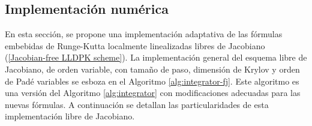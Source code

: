 \subsection{Implementación numérica}\label{sec:fj-num-impl}

En esta sección, se propone una implementación adaptativa de las fórmulas embebidas de Runge-Kutta localmente linealizadas libres de Jacobiano (\ref{Jacobian-free LLDPK scheme}). La implementación general del esquema libre de Jacobiano, de orden variable, con tamaño de paso, dimensión de Krylov y orden de Padé variables se esboza en el Algoritmo \ref{alg:integrator-fj}. Este algoritmo es una versión del Algoritmo \ref{alg:integrator} con modificaciones adecuadas para las nuevas fórmulas. A continuación se detallan las particularidades de esta implementación libre de Jacobiano.

